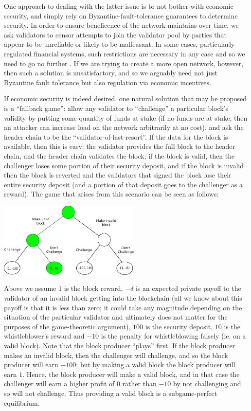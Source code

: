 \documentclass[11pt,a4paper]{report}
\theoremstyle{plain}
\theoremstyle{definition}
\theoremstyle{remark}
\begin{document}
One approach to dealing with the latter issue is to not bother with economic security, and simply rely on Byzantine-fault-tolerance guarantees to determine security. In order to ensure beneficence of the network maintains over time, we ask validators to censor attempts to join the validator pool by parties that appear to be unreliable or likely to be malfeasant. In some cases, particularly regulated financial systems, such restrictions are necessary in any case and so we need to go no further \citep{swanson_consensus-as--service:_2015}. If we are trying to create a more open network, however, then such a solution is unsatisfactory, and so we arguably need not just Byzantine fault tolerance but also regulation via economic incentives.

If economic security is indeed desired, one natural solution that may be proposed is a ``fallback game'': allow any validator to ``challenge'' a particular block's validity by putting some quantity of funds at stake (if no funds are at stake, then an attacker can increase load on the network arbitrarily at no cost), and ask the header chain to be the ``validator-of-last-resort''. If the data for the block is available, then this is easy: the validator provides the full block to the header chain, and the header chain validates the block; if the block is valid, then the challenger loses some portion of their security deposit, and if the block is invalid then the block is reverted and the validators that signed the block lose their entire security deposit (and a portion of that deposit goes to the challenger as a reward). The game that arises from this scenario can be seen as follows:

\begin{center}
\includegraphics[width=200pt]{figs/pdfs/game.pdf}
\end{center}

Above we assume $1$ is the block reward, $-\delta$ is an expected private payoff to the validator of an invalid block getting into the blockchain (all we know about this payoff is that it is less than zero; it could take any magnitude depending on the situation of the particular validator and ultimately does not matter for the purposes of the game-theoretic argument), $100$ is the security deposit, $10$ is the whistleblower's reward and $-10$ is the penalty for whistleblowing falsely (ie. on a valid block). Note that the block producer ``plays'' first. If the block producer makes an invalid block, then the challenger will challenge, and so the block producer will earn $-100$; but by making a valid block the block producer will earn $1$. Hence, the block producer will make a valid block, and in that case the challenger will earn a higher profit of $0$ rather than $-10$ by not challenging and so will not challenge. Thus providing a valid block is a subgame-perfect equilibrium.
\end{document}
